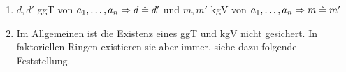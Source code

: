 	\begin{enumerate}[1)]
		\item $d, d'$ ggT von $a_1, \dots, a_n \Rightarrow d \mathrel{\hat=} d'$ und $m, m'$ kgV von $a_1, \dots, a_n \Rightarrow m \mathrel{\hat=} m'$
		\item Im Allgemeinen ist die Existenz eines ggT und kgV nicht gesichert. In faktoriellen Ringen existieren sie aber immer, siehe dazu folgende Feststellung.
	\end{enumerate}
\newpage